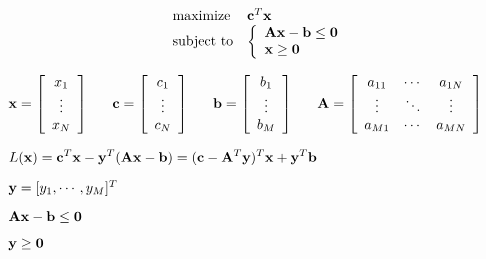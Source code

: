 \documentclass{article}
\def\lthtmlcheckvsize{\ifdim\ht\sizebox<\vsize 
  \ifdim\wd\sizebox<\hsize\expandafter\hfill\fi \expandafter\vfill
  \else\expandafter\vss\fi}%
\begin{document}
{\newpage\clearpage
{}%
\begin{displaymath}\begin{array}{ll}
\mbox{maximize} & {\bf c}^T{\bf x}\\
\mbox{subject to} & \left\{\begin{array}{l}
{\bf Ax}-{\bf b}\le {\bf0}\\
{\bf x}\ge {\bf0}\end{array}\right.\\
\end{array}\end{displaymath}%
\lthtmldisplayZ
\lthtmlcheckvsize\clearpage}

{\newpage\clearpage
{}%
$\displaystyle {\bf x}=\left[\begin{array}{c}x_1\\\vdots\\x_N\end{array}\right]
\;\;\;\;\;\;
{\bf c}=\left[\begin{array}{c}c_1\\\vdots\\c_N\end{array}\right]
\;\;\;\;\;\;
{\bf b}=\left[\begin{array}{c}b_1\\\vdots\\b_M\end{array}\right]
\;\;\;\;\;\;
{\bf A}=\left[\begin{array}{ccc}a_{11}&\cdots&a_{1N}\\
\vdots & \ddots & \vdots \\a_{M1}&\cdots&a_{MN}\end{array}\right]$%
\lthtmlindisplaymathZ
\lthtmlcheckvsize\clearpage}

{\newpage\clearpage
{}%
$\displaystyle L({\bf x})={\bf c}^T{\bf x}-{\bf y}^T({\bf Ax}-{\bf b})
=({\bf c}-{\bf A}^T{\bf y})^T{\bf x}+{\bf y}^T{\bf b}$%
\lthtmlindisplaymathZ
\lthtmlcheckvsize\clearpage}

{\newpage\clearpage
{}%
$ {\bf y}=[y_1,\cdots,y_M]^T$%
\lthtmlindisplaymathZ
\lthtmlcheckvsize\clearpage}

{\newpage\clearpage
{}%
$ {\bf Ax}-{\bf b}\le{\bf0}$%
\lthtmlindisplaymathZ
\lthtmlcheckvsize\clearpage}

{\newpage\clearpage
{}%
$ {\bf y}\ge{\bf0}$%
\lthtmlindisplaymathZ
\lthtmlcheckvsize\clearpage}
\end{document}
